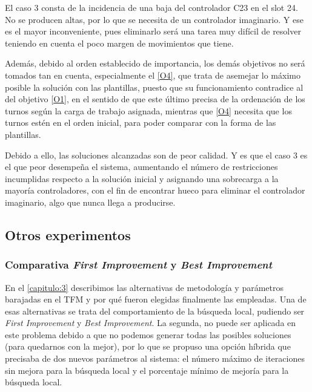 El caso 3 consta de la incidencia de una baja del controlador C23 en el slot 24. No se producen altas, por lo que se necesita de un controlador imaginario. Y ese es el mayor inconveniente, pues eliminarlo será una tarea muy difícil de resolver teniendo en cuenta el poco margen de movimientos que tiene. 

Además, debido al orden establecido de importancia, los demás objetivos no será tomados tan en cuenta, especialmente el \ref{O4}, que trata de asemejar lo máximo posible la solución con las plantillas, puesto que su funcionamiento contradice al del objetivo \ref{O1}, en el sentido de que este último precisa de la ordenación de los turnos según la carga de trabajo asignada, mientras que \ref{O4} necesita que los turnos estén en el orden inicial, para poder comparar con la forma de las plantillas. %

Debido a ello, las soluciones alcanzadas son de peor calidad. Y es que el caso 3 es el que peor desempeña el sistema, aumentando el número de restricciones incumplidas respecto a la solución inicial y asignando una sobrecarga a la mayoría controladores, con el fin de encontrar hueco para eliminar el controlador imaginario, algo que nunca llega a producirse.


\subsection{Otros experimentos}

\subsubsection{Comparativa \textit{First Improvement} y \textit{Best Improvement}}

En el \autoref{capitulo:3} describimos las alternativas de metodología y parámetros barajadas en el TFM y por qué fueron elegidas finalmente las empleadas. Una de esas alternativas se trata del comportamiento de la búsqueda local, pudiendo ser \textit{First Improvement} y \textit{Best Improvement}. La segunda, no puede ser aplicada en este problema debido a que no podemos generar todas las posibles soluciones (para quedarnos con la mejor), por lo que se propuso una opción híbrida que precisaba de dos nuevos parámetros al sistema: el número máximo de iteraciones sin mejora para la búsqueda local y el porcentaje mínimo de mejoría para la búsqueda local.

